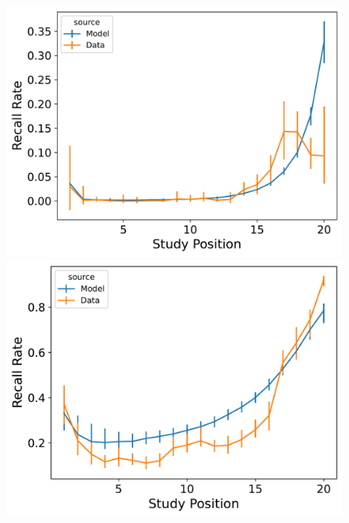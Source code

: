 \documentclass[
  letterpaper,
  11pt,
  english,
  singlespacing,
  headsepline]{MastersDoctoralThesis}
\begin{document}
\begin{figure}
\begin{minipage}{0.33\linewidth}
\includegraphics{icmr_figures/Murdock1962_InstanceCMR_Model_Fitting_LL20_pnr-1.png}\end{minipage}%
%
\begin{minipage}{0.33\linewidth}
\includegraphics{icmr_figures/Murdock1962_InstanceCMR_Model_Fitting_LL20_spc-1.png}\end{minipage}%
\newline
\begin{minipage}{0.33\linewidth}

\end{minipage}
\end{figure}
\end{document}
